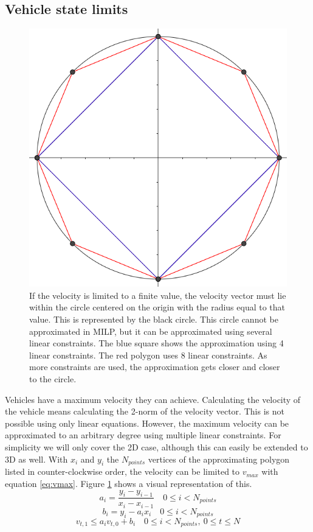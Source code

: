 \subsection{Vehicle state limits}
\begin{figure}
    \centering
        \includegraphics[width=0.5\columnwidth]{img/circlelinear}
    \caption{If the velocity is limited to a finite value, the velocity vector must lie within the circle centered on the origin with the radius equal to that value. This is represented by the black circle. This circle cannot be approximated in MILP, but it can be approximated using several linear constraints. The blue square shows the approximation using 4 linear constraints. The red polygon uses 8 linear constraints. As more constraints are used, the approximation gets closer and closer to the circle. }\label{fig:circlelinear}
\end{figure}
Vehicles have a maximum velocity they can achieve. Calculating the velocity of the vehicle means calculating the 2-norm of the velocity vector. This is not possible using only linear equations. However, the maximum velocity can be approximated to an arbitrary degree using multiple linear constraints. For simplicity we will only cover the 2D case, although this can easily be extended to 3D as well. With $x_i$ and $y_i$ the $N_{points}$ vertices of the approximating polygon listed in counter-clockwise order, the velocity can be limited to $v_{max}$ with equation \ref{eq:vmax}. Figure \ref{fig:circlelinear} shows a visual representation of this.
\begin{equation}
\label{eq:lin-a}
a_i = \dfrac{y_{i} - y_{i-1}}{x_{i} - x_{i-1}} \quad 0 \leq i < N_{points}
\end{equation}
\begin{equation}
\label{eq:lin-b}
b_i = y_{i} - a_i x_i  \quad 0 \leq i < N_{points}
\end{equation}
\begin{equation}
\label{eq:vmax}
v_{t, 1} \leq a_i v_{t,0} + b_i  \quad 0 \leq i < N_{points}, ~ 0 \leq t \leq N
\end{equation}


